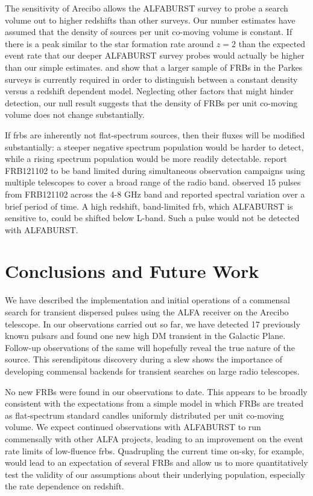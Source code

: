 \documentclass[a4paper,fleqn,usenatbib]{mnras}
\begin{document}
The sensitivity of Arecibo allows the ALFABURST survey to probe a search volume
out to higher redshifts than other surveys. Our number estimates have assumed
that the density of sources per unit co-moving volume is constant.  If there is
a peak similar to the star formation rate around $z=2$
\citep{2014ARA&A..52..415M} than the expected event rate that our deeper
ALFABURST survey probes would actually be higher than our simple estimates.
\citet{2016MNRAS.458..708C} and \citet{ranethesis} show that a larger sample of
FRBs in the Parkes surveys is currently required in order to distinguish
between a constant density versus a redshift dependent model. Neglecting other
factors that might hinder detection, our null result suggests that the density
of FRBs per unit co-moving volume does not change substantially.

If \glspl{frb} are inherently not flat-spectrum sources, then their fluxes will
be modified substantially: a steeper negative spectrum population would be
harder to detect, while a rising spectrum population would be more readily
detectable.  \cite{2017arXiv170507553L} report FRB121102 to be band limited
during simultaneous observation campaigns using multiple telescopes to cover a
broad range of the radio band. \cite{atel10675} observed 15 pulses from
FRB121102 across the 4-8 GHz band and reported spectral variation over a brief
period of time. A high redshift, band-limited \gls{frb}, which ALFABURST is
sensitive to, could be shifted below L-band. Such a pulse would not be detected
with ALFABURST.

\section{Conclusions and Future Work}
\label{sec:future_work}

We have described the implementation and initial operations of a commensal
search for transient dispersed pulses using the ALFA receiver on the Arecibo
telescope. In our observations carried out so far, we have detected 17
previously known pulsars and found one new  high DM transient in the Galactic
Plane.  Follow-up observations of the same will hopefully reveal the true nature
of the source. This serendipitous discovery during a slew shows the importance
of developing commensal backends for transient searches on large radio
telescopes.

No new FRBs were found in our observations to date. This appears to be broadly
consistent with the expectations from a simple model in which FRBs are treated
as flat-spectrum standard candles uniformly distributed per unit co-moving
volume. We expect continued observations with ALFABURST to run commensally with
other ALFA projects, leading to an improvement on the event rate limits of
low-fluence \glspl{frb}. Quadrupling the current time on-sky, for example,
would lead to an expectation of several FRBs and allow us to more
quantitatively test the validity of our assumptions about their underlying
population, especially the rate dependence on redshift.
\end{document}
